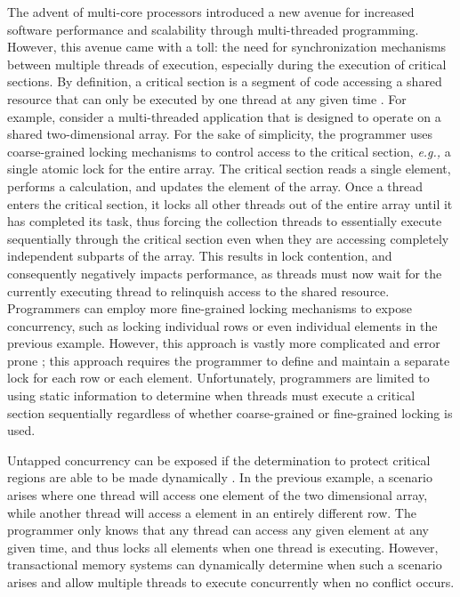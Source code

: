 \documentclass[11pt]{book}
\begin{document}
The advent of multi-core processors introduced a new avenue for increased software
performance and scalability through multi-threaded programming.  However, this avenue came
with a toll: the need for synchronization mechanisms between multiple threads of
execution, especially during the execution of critical sections.  By definition, a
critical section is a segment of code accessing a shared resource that can only be
executed by one thread at any given time \cite{os_concepts}.  For example, consider a
multi-threaded application that is designed to operate on a shared two-dimensional array.
For the sake of simplicity, the programmer uses coarse-grained locking mechanisms to
control access to the critical section, \emph{e.g.,} a single atomic lock for the entire
array.  The critical section reads a single element, performs a calculation, and updates
the element of the array.  Once a thread enters the critical section, it locks all other
threads out of the entire array until it has completed its task, thus forcing the
collection threads to essentially execute sequentially through the critical section even
when they are accessing completely independent subparts of the array.  This results in
lock contention, and consequently negatively impacts performance, as threads must now wait
for the currently executing thread to relinquish access to the shared resource.
Programmers can employ more fine-grained locking mechanisms to expose concurrency, such as
locking individual rows or even individual elements in the previous example.  However,
this approach is vastly more complicated and error prone \cite{sle_rajwar}; this approach
requires the programmer to define and maintain a separate lock for each row or each
element.  Unfortunately, programmers are limited to using static information to 
determine when threads must execute a critical section sequentially regardless of whether
coarse-grained or fine-grained locking is used.


Untapped concurrency can be exposed if the determination to protect critical regions are
able to be made dynamically \cite{intel_prog_ref}.  In the previous example, a scenario
arises where one thread will access one element of the two dimensional array, while
another thread will access a element in an entirely different row.  The programmer only
knows that any thread can access any given element at any given time, and thus locks all
elements when one thread is executing.  However, transactional memory systems
\cite{sle_rajwar} can dynamically determine when such a scenario arises and allow multiple
threads to execute concurrently when no conflict occurs.
\end{document}
